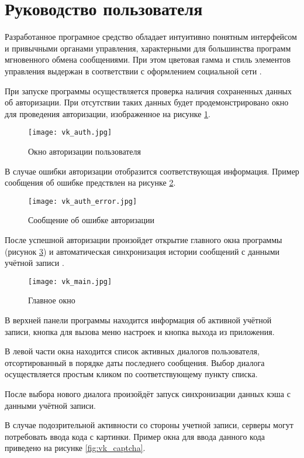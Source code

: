 \section{Руководство пользователя}

Разработанное програмное средство обладает интуитивно понятным интерфейсом и
привычными органами управления, характерными для большинства программ
мгновенного обмена сообщениями. При этом цветовая гамма и стиль элементов
управления выдержан в соответствии с оформлением социальной сети \vk{}.
 
При запуске программы осуществляется проверка наличия сохраненных данных об
авторизации. При отсутствии таких данных будет продемонстрировано окно
для проведения авторизации, изображенное на рисунке \ref{fig:vk_auth}.

\begin{figure}[h]
\centering
\texttt{[image: vk\_auth.jpg]}
\caption{Окно авторизации пользователя}
\label{fig:vk_auth}
\end{figure}

В случае ошибки авторизации отобразится соответствующая информация. Пример
сообщения об ошибке предствлен на рисунке \ref{fig:vk_auth_error}.

\begin{figure}[h!]
\centering
\texttt{[image: vk\_auth\_error.jpg]}
\caption{Сообщение об ошибке авторизации}
\label{fig:vk_auth_error}
\end{figure}

После успешной авторизации произойдет открытие главного окна программы (рисунок
\ref{fig:vk_main}) и автоматическая синхронизация истории сообщений с данными
учётной записи \vk{}.

\begin{figure}[h] \centering \texttt{[image: vk\_main.jpg]}
\caption{Главное окно \vkapp{}}
\label{fig:vk_main}
\end{figure}


В верхней панели программы находится информация об активной учётной записи,
кнопка для вызова меню настроек и кнопка выхода из приложения.

В левой части окна находится список активных диалогов пользователя,
отсортированный в порядке даты последнего сообщения. Выбор диалога
осуществляется простым кликом по соответствующему пункту списка.

После выбора нового диалога произойдёт запуск синхронизации данных кэша с
данными учётной записи.

В случае подозрительной активности со стороны учетной записи, серверы \vk могут
потребовать ввода кода с картинки. Пример окна для ввода данного кода приведено
на рисунке \ref{fig:vk_captcha}.

